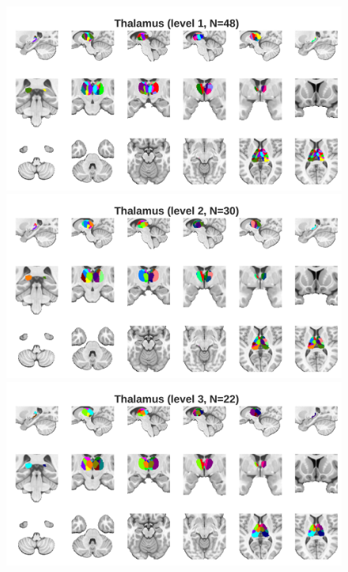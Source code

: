 \documentclass[10pt,letterpaper]{article}
\begin{document}
\begin{figure}[t]
\centering
\begin{minipage}{\linewidth}
\includegraphics[width=\linewidth]{images/thal_fine.png}
\end{minipage}
\begin{minipage}{\linewidth}
\includegraphics[width=\linewidth]{images/thal_coarse.png}
\end{minipage}
\begin{minipage}{\linewidth}
\includegraphics[width=\linewidth]{images/thal_coarser.png}

\end{minipage}
\end{figure}
\end{document}

